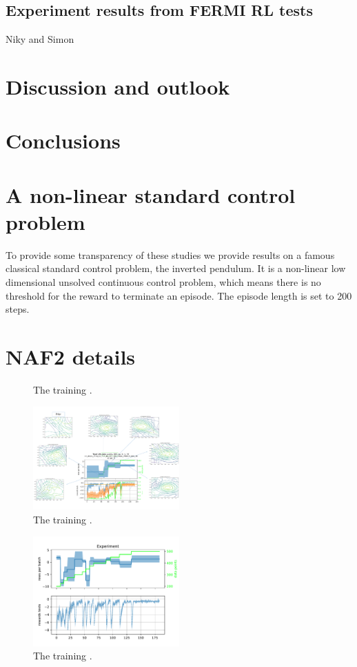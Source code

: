 \documentclass[
 reprint,
 amsmath,amssymb,amsfonts,clevref,
 aps,
prstab,
]{revtex4-2}
\begin{document}
\subsection{Experiment results from FERMI RL tests}
Niky and Simon

\section{Discussion and outlook}

\section{Conclusions}


\appendix
\section{A non-linear standard control problem}
To provide some transparency of these studies we provide results on a famous classical standard control problem, the inverted pendulum. It is a non-linear low dimensional unsolved continuous control problem, which means there is no threshold for the reward to terminate an episode. The episode length is set to 200 steps.
\section{NAF2 details}\label{appendix:pernaf}

\begin{figure}[!h]
  \centering
  
  \caption{The training .}
  \label{fig:comparsion_per}
\end{figure}


\begin{figure}[!h]
  \centering
  \includegraphics*[width=0.5\textwidth]{Figures/Learning_evolution}
  \caption{The training .}
  \label{fig:comparsion_per}
\end{figure}

\begin{figure}[!h]
  \centering
  \includegraphics*[width=0.5\textwidth]{Figures/AE-DYNA_observables.pdf}
  \caption{The training .}
  \label{fig:comparsion_per}
\end{figure}
\end{document}
